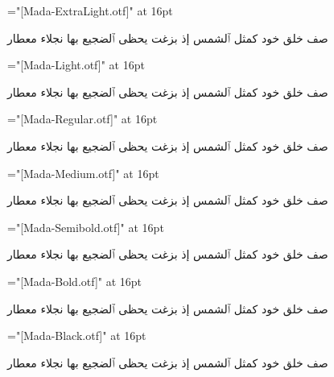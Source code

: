 \nopagenumbers
{}
\def\sample#1{%
  \font\test="[Mada-#1.otf]" at 16pt%
  \centerline{%
    \beginR%
    \test%
    صف خلق خود كمثل ٱلشمس إذ بزغت يحظى ٱلضجيع بها نجلاء معطار%
    \endR%
  }%
}

\sample{ExtraLight}
\sample{Light}
\sample{Regular}
\sample{Medium}
\sample{Semibold}
\sample{Bold}
\sample{Black}
\bye
